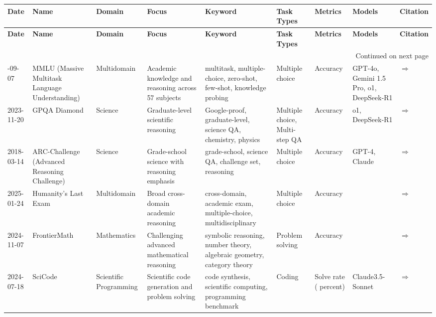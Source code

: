 \documentclass{article}
\begin{document}
\begin{landscape}
{\footnotesize
\begin{longtable}{|p{1.5cm}|p{2.5cm}|p{2cm}|p{2cm}|p{2.5cm}|p{3cm}|p{2cm}|p{2cm}|p{1cm}|}
\hline
{\bf Date} & {\bf Name} & {\bf Domain} & {\bf Focus} & {\bf Keyword} & {\bf Task Types} & {\bf Metrics} & {\bf Models} & {\bf Citation} \\ \hline
\endfirsthead
\hline
{\bf Date} & {\bf Name} & {\bf Domain} & {\bf Focus} & {\bf Keyword} & {\bf Task Types} & {\bf Metrics} & {\bf Models} & {\bf Citation} \\ \hline
\endhead
\hline
\multicolumn{9}{r}{Continued on next page} \\
\endfoot
\hline
\endlastfoot
2020-09-07 & MMLU (Massive Multitask Language Understanding) & Multidomain & Academic knowledge and reasoning across 57 subjects &  multitask, multiple-choice, zero-shot, few-shot, knowledge probing  &  Multiple choice  &  Accuracy  &  GPT-4o, Gemini 1.5 Pro, o1, DeepSeek-R1  & \cite{hendrycks2021measuring} \href{https://arxiv.org/abs/2009.03300}{$\Rightarrow$ } \\ \hline
2023-11-20 & GPQA Diamond & Science & Graduate-level scientific reasoning &  Google-proof, graduate-level, science QA, chemistry, physics  &  Multiple choice, Multi-step QA  &  Accuracy  &  o1, DeepSeek-R1  & \cite{rein2023gpqagraduatelevelgoogleproofqa} \href{https://arxiv.org/abs/2311.12022}{$\Rightarrow$ } \\ \hline
2018-03-14 & ARC-Challenge (Advanced Reasoning Challenge) & Science & Grade-school science with reasoning emphasis &  grade-school, science QA, challenge set, reasoning  &  Multiple choice  &  Accuracy  &  GPT-4, Claude  & \cite{clark2018think} \href{https://allenai.org/data/arc}{$\Rightarrow$ } \\ \hline
2025-01-24 & Humanity's Last Exam & Multidomain & Broad cross-domain academic reasoning &  cross-domain, academic exam, multiple-choice, multidisciplinary  &  Multiple choice  &  Accuracy  &    & \cite{phan2025humanitys} \href{https://arxiv.org/abs/2501.14249}{$\Rightarrow$ } \\ \hline
2024-11-07 & FrontierMath & Mathematics & Challenging advanced mathematical reasoning &  symbolic reasoning, number theory, algebraic geometry, category theory  &  Problem solving  &  Accuracy  &    & \cite{glazer2024frontiermath} \href{https://arxiv.org/abs/2411.04872}{$\Rightarrow$ } \\ \hline
2024-07-18 & SciCode & Scientific Programming & Scientific code generation and problem solving &  code synthesis, scientific computing, programming benchmark  &  Coding  &  Solve rate ( percent)  &  Claude3.5-Sonnet  & \cite{tian2024scicode} \href{https://arxiv.org/abs/2407.13168}{$\Rightarrow$ } \\ \hline

\end{longtable}}
\end{landscape}
\end{document}
